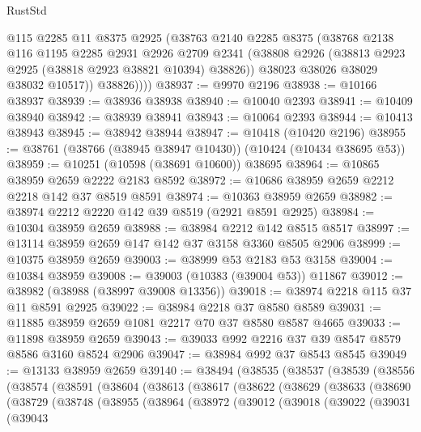 \begin{lexlean}{RustStd}
\begin{coremodule}
            @115
            @2285
            @11
            @8375
            @2925
            (@38763
              @2140
              @2285
              @8375
              (@38768
                @2138
                @116
                @1195
                @2285
                @2931
                @2926
                @2709
                @2341
                (@38808 @2926 (@38813 @2923 @2925 (@38818 @2923 @38821 @10394) @38826))
                @38023
                @38026
                @38029
                @38032
                @10517))
            @38826))))
@38937 := @9970 @2196
@38938 := @10166 @38937
@38939 := @38936 @38938
@38940 := @10040 @2393
@38941 := @10409 @38940
@38942 := @38939 @38941
@38943 := @10064 @2393
@38944 := @10413 @38943
@38945 := @38942 @38944
@38947 := @10418 (@10420 @2196)
@38955 := @38761 (@38766 (@38945 @38947 @10430)) (@10424 (@10434 @38695 @53))
@38959 := @10251 (@10598 (@38691 @10600)) @38695
@38964 := @10865 @38959 @2659 @2222 @2183 @8592
@38972 := @10686 @38959 @2659 @2212 @2218 @142 @37 @8519 @8591
@38974 := @10363 @38959 @2659
@38982 := @38974 @2212 @2220 @142 @39 @8519 (@2921 @8591 @2925)
@38984 := @10304 @38959 @2659
@38988 := @38984 @2212 @142 @8515 @8517
@38997 := @13114 @38959 @2659 @147 @142 @37 @3158 @3360 @8505 @2906
@38999 := @10375 @38959 @2659
@39003 := @38999 @53 @2183 @53 @3158
@39004 := @10384 @38959
@39008 := @39003 (@10383 (@39004 @53)) @11867
@39012 := @38982 (@38988 (@38997 @39008 @13356))
@39018 := @38974 @2218 @115 @37 @11 @8591 @2925
@39022 := @38984 @2218 @37 @8580 @8589
@39031 := @11885 @38959 @2659 @1081 @2217 @70 @37 @8580 @8587 @4665
@39033 := @11898 @38959 @2659
@39043 := @39033 @992 @2216 @37 @39 @8547 @8579 @8586 @3160 @8524 @2906
@39047 := @38984 @992 @37 @8543 @8545
@39049 := @13133 @38959 @2659
@39140 := @38494
    (@38535
      (@38537
        (@38539
          (@38556
            (@38574
              (@38591
                (@38604
                  (@38613
                    (@38617
                      (@38622
                        (@38629
                          (@38633
                            (@38690
                              (@38729
                                (@38748
                                  (@38955
                                    (@38964
                                      (@38972
                                        (@39012
                                          (@39018
                                            (@39022
                                              (@39031
                                                (@39043

\end{coremodule}
\end{lexlean}
